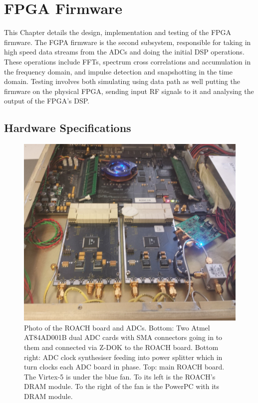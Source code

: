\chapter{FPGA Firmware}
\label{ch:firmware-design}
\graphicspath{{./img/firmware/}}

This Chapter details the design, implementation and testing of the FPGA firmware. The FGPA firmware is the second subsystem, responsible for taking in high speed data streams from the ADCs and doing the initial DSP operations. These operations include FFTs, spectrum cross correlations and accumulation in the frequency domain, and impulse detection and snapshotting in the time domain. Testing involves both simulating using data path as well putting the firmware on the physical FPGA, sending input RF signals to it and analysing the output of the FPGA's DSP.

\section{Hardware Specifications}

\begin{figure}
  \centering
  \includegraphics[width=\textwidth]{roach-photo}
  \caption{Photo of the ROACH board and ADCs. Bottom: Two Atmel AT84AD001B dual ADC cards with SMA connectors going in to them and connected via Z-DOK to the ROACH board. Bottom right: ADC clock synthesiser feeding into power splitter which in turn clocks each ADC board in phase. Top: main ROACH board. The Virtex-5 is under the blue fan. To its left is the ROACH's DRAM module. To the right of the fan is the PowerPC with its DRAM module.}
  \label{fig:firmware:roach-photo}
\end{figure}


